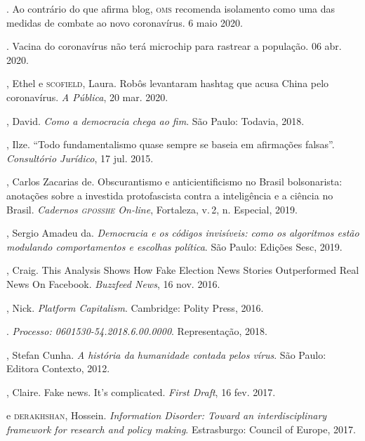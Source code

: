 \begin{bibliohedra}
. Ao contrário do que afirma blog, \textsc{oms} recomenda isolamento como uma das medidas de combate ao novo coronavírus. 6 maio 2020.

\titidem. Vacina do coronavírus não terá microchip para rastrear a população. 06 abr. 2020. 

, Ethel e \textsc{scofield}, Laura. Robôs levantaram hashtag que
acusa China pelo coronavírus. \textit{A Pública}, 20 mar. 2020.

, David. \textit{Como a democracia chega ao fim}. São Paulo:
Todavia, 2018.

, Ilze. ``Todo fundamentalismo quase sempre se baseia em afirmações falsas''. \textit{Consultório Jurídico}, 17 jul. 2015.

, Carlos Zacarias de. Obscurantismo e anticientificismo no
Brasil bolsonarista: anotações sobre a investida protofascista contra a
inteligência e a ciência no Brasil. \textit{Cadernos \textsc{gposshe} On-line},
Fortaleza, v.\,2, n. Especial, 2019.

, Sergio Amadeu da. \textit{Democracia e os códigos
invisíveis: como os algoritmos estão modulando comportamentos e escolhas
política}. São Paulo: Edições Sesc, 2019.

, Craig. This Analysis Shows How Fake Election News
Stories Outperformed Real News On Facebook. \textit{Buzzfeed News}, 16 nov. 2016.

, Nick. \textit{Platform Capitalism}. Cambridge: Polity Press, 2016.

. \textit{Processo: 0601530-54.2018.6.00.0000}. Representação, 2018.

, Stefan Cunha. \textit{A história da humanidade contada pelos vírus}. São Paulo:
Editora Contexto, 2012.

, Claire. Fake news. It’s complicated. \textit{First Draft}, 16 fev. 2017.

\titidem\mbox{} e \textsc{derakhshan}, Hossein. \textit{Information
Disorder: Toward an interdisciplinary framework for research and policy
making}. Estrasburgo: Council of Europe, 2017.
\end{bibliohedra}
